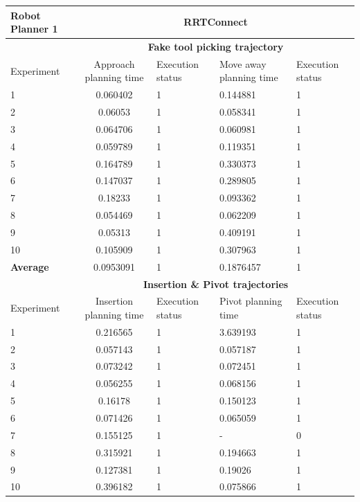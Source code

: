 \begin{table}[H]
\centering
\begin{tabular}{|p{2cm}|c|p{2cm}|p{2cm}|p{2cm}|}
\hline
Robot Planner 1           & \multicolumn{4}{c}{\textbf{RRTConnect}}                                                                                                 \vline \\
\hline
                          & \multicolumn{4}{c}{\textbf{Fake tool picking trajectory}}                     \vline \\
\hline
Experiment                & Approach planning time & Execution status & Move away planning time & Execution status  \\
\hline
1 &	0.060402 &	1 &	0.144881 &	1 \\
2 &	0.06053 &	1 &	0.058341 &	1 \\
3 &	0.064706 &	1 &	0.060981 &	1 \\
4 &	0.059789 &	1 &	0.119351 &	1 \\
5 &	0.164789 &	1 &	0.330373 &	1 \\
6 &	0.147037 &	1 &	0.289805 &	1 \\
7 &	0.18233 &	1 &	0.093362 &	1 \\
8 &	0.054469 &	1 &	0.062209 &	1 \\
9 &	0.05313 &	1 &	0.409191 &	1 \\
10 &	0.105909 &	1 &	0.307963 &	1 \\
\hline
\textbf{Average} & 	0.0953091 &	1	& 0.1876457	& 1 \\
\hline
                          & \multicolumn{4}{c}{\textbf{Insertion \& Pivot trajectories}}                     \vline \\
\hline
Experiment                & Insertion planning time & Execution status & Pivot planning time & Execution status  \\
\hline
1	& 0.216565	& 1	& 3.639193	& 1 \\
2	& 0.057143	& 1	& 0.057187	& 1 \\
3	& 0.073242	& 1	& 0.072451	& 1 \\
4	& 0.056255	& 1	& 0.068156	& 1 \\
5	& 0.16178	& 1	& 0.150123	& 1 \\
6	& 0.071426	& 1	& 0.065059	& 1 \\
7	& 0.155125	& 1	& -	& 0 \\
8	& 0.315921	& 1	& 0.194663	& 1 \\
9	& 0.127381	& 1	& 0.19026	& 1 \\
10	& 0.396182	& 1	& 0.075866	& 1 \\

\end{tabular}
\end{table}
